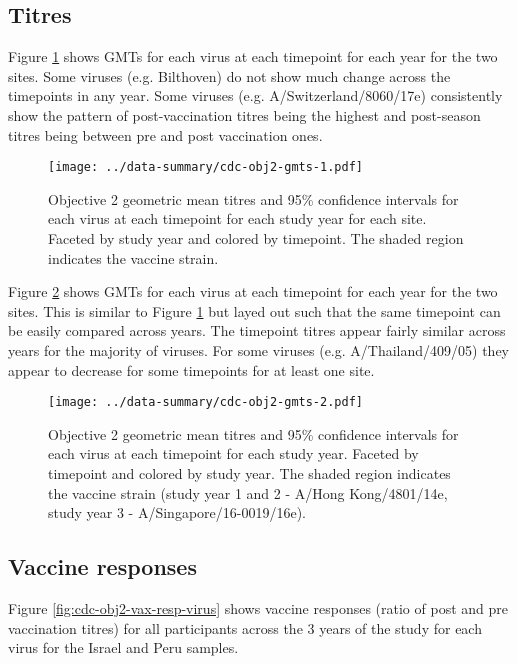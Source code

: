 \documentclass[12pt]{article}
\begin{document}


\subsection{Titres}

Figure \ref{fig:cdc-obj2-gmts-1} shows GMTs for each virus at each timepoint for each year for the two sites.
Some viruses (e.g. Bilthoven) do not show much change across the timepoints in
any year. Some viruses (e.g. A/Switzerland/8060/17e) consistently show the pattern of post-vaccination titres being the highest and post-season titres being between pre and post vaccination ones.

\begin{figure}
	\texttt{[image: ../data-summary/cdc-obj2-gmts-1.pdf]}
	\caption{Objective 2 geometric mean titres and 95\% confidence intervals for each virus at each timepoint for each study year for each site. Faceted by study year and colored by timepoint. The shaded region indicates the vaccine strain.}
	\label{fig:cdc-obj2-gmts-1}
\end{figure}

Figure \ref{fig:cdc-obj2-gmts-2} shows GMTs for each virus at each timepoint for each year for the two sites. This is similar to Figure \ref{fig:cdc-obj2-gmts-1} but layed out such that the same timepoint can be easily compared across years. The timepoint titres appear fairly similar across years for the majority of viruses. For some viruses (e.g. A/Thailand/409/05) they appear to decrease for some timepoints for at least one site.

\begin{figure}
	\texttt{[image: ../data-summary/cdc-obj2-gmts-2.pdf]}
	\caption{Objective 2 geometric mean titres and 95\% confidence intervals for each virus at each timepoint for each study year. Faceted by timepoint and colored by study year. The shaded region indicates the vaccine strain (study year 1 and 2 - A/Hong Kong/4801/14e, study year 3 - A/Singapore/16-0019/16e).}
	\label{fig:cdc-obj2-gmts-2}
\end{figure}

\subsection{Vaccine responses}

Figure \ref{fig:cdc-obj2-vax-resp-virus} shows vaccine responses (ratio of post and pre vaccination titres)
for all participants across the 3 years of the study for each virus for the Israel and Peru samples.
\end{document}
